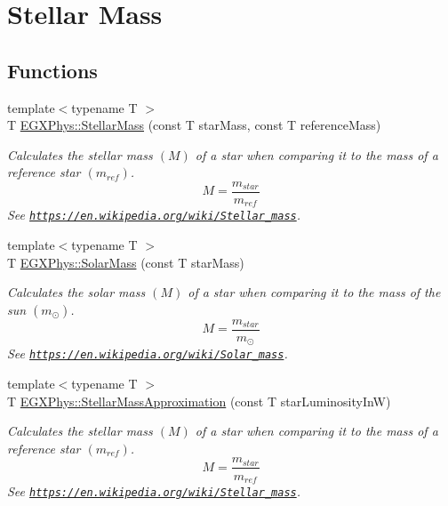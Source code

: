 \hypertarget{group___e_g_x_phys-_stellar_mass}{}\section{Stellar Mass}
\label{group___e_g_x_phys-_stellar_mass}
\subsection*{Functions}
\begin{DoxyCompactItemize}
\item 
{\footnotesize template$<$typename T $>$ }\\T \mbox{\hyperlink{group___e_g_x_phys-_stellar_mass_ga6c1b42cfd62e3174709ddbf15a87b460}{E\+G\+X\+Phys\+::\+Stellar\+Mass}} (const T star\+Mass, const T reference\+Mass)
\begin{DoxyCompactList}\small\item\em Calculates the stellar mass $(M)$ of a star when comparing it to the mass of a reference star $(m_{ref})$. \[M=\frac{m_{star}}{m_{ref}}\] See \href{https://en.wikipedia.org/wiki/Stellar_mass}{\tt https\+://en.\+wikipedia.\+org/wiki/\+Stellar\+\_\+mass}. \end{DoxyCompactList}\item 
{\footnotesize template$<$typename T $>$ }\\T \mbox{\hyperlink{group___e_g_x_phys-_stellar_mass_ga4988f903a27ec9cfa63f72b003d876fd}{E\+G\+X\+Phys\+::\+Solar\+Mass}} (const T star\+Mass)
\begin{DoxyCompactList}\small\item\em Calculates the solar mass $(M)$ of a star when comparing it to the mass of the sun $(m_\odot)$. \[M=\frac{m_{star}}{m_\odot}\] See \href{https://en.wikipedia.org/wiki/Solar_mass}{\tt https\+://en.\+wikipedia.\+org/wiki/\+Solar\+\_\+mass}. \end{DoxyCompactList}\item 
{\footnotesize template$<$typename T $>$ }\\T \mbox{\hyperlink{group___e_g_x_phys-_stellar_mass_ga5eeb9652876859bff3afdd352dd7925e}{E\+G\+X\+Phys\+::\+Stellar\+Mass\+Approximation}} (const T star\+Luminosity\+InW)
\begin{DoxyCompactList}\small\item\em Calculates the stellar mass $(M)$ of a star when comparing it to the mass of a reference star $(m_{ref})$. \[M=\frac{m_{star}}{m_{ref}}\] See \href{https://en.wikipedia.org/wiki/Stellar_mass}{\tt https\+://en.\+wikipedia.\+org/wiki/\+Stellar\+\_\+mass}. \end{DoxyCompactList}\item 

\end{DoxyCompactItemize}
